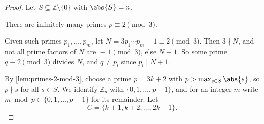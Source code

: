 \begin{proof}
    Let \(S \subseteq \mathbb{Z} \setminus \{0\}\) with \(\abs{S} = n\).

    \begin{lemma}\label{lem:primes-2-mod-3}
        There are infinitely many primes \(p \equiv 2 \pmod 3\).
    \end{lemma}
    \begin{subproof}
        Given such primes \(p_1, \ldots, p_m\), let \(N = 3 p_1 \cdots p_m - 1 \equiv 2 \pmod 3\). Then \(3 \nmid N\), and not all prime factors of \(N\) are \(\equiv 1 \pmod 3\), else \(N \equiv 1\). So some prime \(q \equiv 2 \pmod 3\) divides \(N\), and \(q \ne p_i\) since \(p_i \mid N + 1\).
    \end{subproof}

    By \autoref{lem:primes-2-mod-3}, choose a prime \(p = 3k + 2\) with \(p > \max_{s \in S} \abs{s}\), so \(p \nmid s\) for all \(s \in S\). We identify \(\mathbb{Z}_p\) with \(\{0, 1, \ldots, p-1\}\), and for an integer \(m\) write \(m \bmod p \in \{0, 1, \ldots, p-1\}\) for its remainder. Let
    \[
        C = \{k+1, k+2, \ldots, 2k+1\}.
    \]


\end{proof}

